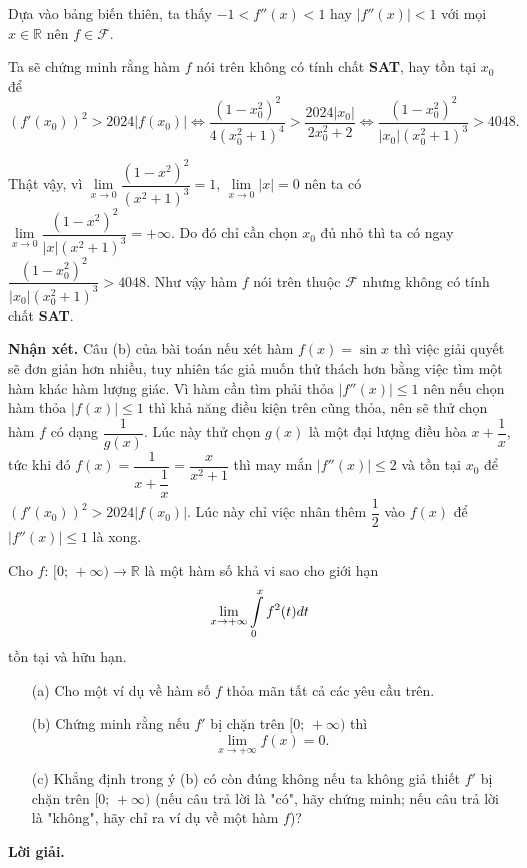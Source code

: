 \begin{enumerate}
{        Dựa vào bảng biến thiên, ta thấy $-1 < f''(x) < 1$ hay $|f''(x)| < 1$ với mọi $x \in \mathbb{R}$ nên $f\in \mathcal{F}$.

        Ta sẽ chứng minh rằng hàm $f$ nói trên không có tính chất \textbf{SAT}, hay tồn tại $x_0$ để $$\left(f'(x_0)\right)^2 > 2024|f(x_0)| \iff \dfrac{(1-x_0^2)^2}{4(x_0^2+1)^4} > \dfrac{2024|x_0|}{2x_0^2+2} \iff \dfrac{(1-x_0^2)^2}{|x_0|(x_0^2+1)^3}>4048.$$

        Thật vậy, vì $\lim\limits_{x \to 0} \dfrac{(1-x^2)^2}{(x^2+1)^3} = 1,\,\lim\limits_{x \to 0} |x| = 0$ nên ta có $\lim\limits_{x \to 0} \dfrac{(1-x^2)^2}{|x|(x^2+1)^3} = +\infty$. Do đó chỉ cần chọn $x_0$ đủ nhỏ thì ta có ngay $\dfrac{(1-x_0^2)^2}{|x_0|(x_0^2+1)^3}>4048$. Như vậy hàm $f$ nói trên thuộc $\mathcal{F}$ nhưng không có tính chất \textbf{SAT}.
    }
\end{enumerate}

\textbf{Nhận xét. }Câu (b) của bài toán nếu xét hàm $f(x) = \sin x$ thì việc giải quyết sẽ đơn giản hơn nhiều, tuy nhiên tác giả muốn thử thách hơn bằng việc tìm một hàm khác hàm lượng giác. Vì hàm cần tìm phải thỏa $|f''(x)| \leq 1$ nên nếu chọn hàm thỏa $|f(x)| \leq 1$ thì khả năng điều kiện trên cũng thỏa, nên sẽ thử chọn hàm $f$ có dạng $\dfrac{1}{g(x)}$. Lúc này thử chọn $g(x)$ là một đại lượng điều hòa $x + \dfrac{1}{x}$, tức khi đó $f(x) = \dfrac{1}{x + \dfrac{1}{x}} = \dfrac{x}{x^2 + 1}$ thì may mắn $|f''(x)| \leq 2$ và tồn tại $x_0$ để $\left(f'(x_0)\right)^2 > 2024|f(x_0)|$. Lúc này chỉ việc nhân thêm $\dfrac{1}{2}$ vào $f(x)$ để $|f''(x)| \leq 1$ là xong.

\begin{tcolorbox}[title=\textbf{Bài toán A.5.},breakable]
    Cho $f:\,[0;\,+\infty) \to \mathbb{R}$ là một hàm số khả vi sao cho giới hạn $$\lim\limits_{x \to +\infty} \int\displaylimits_{0}^{x}f^2(t)dt$$ tồn tại và hữu hạn.

    \begin{enumerate}
        \item[(a)] {Cho một ví dụ về hàm số $f$ thỏa mãn tất cả các yêu cầu trên.}
        \item[(b)] {Chứng minh rằng nếu $f'$ bị chặn trên $[0;\,+\infty)$ thì $$\lim\limits_{x \to +\infty}f(x) = 0.$$}  
        \item[(c)] {Khẳng định trong ý (b) có còn đúng không nếu ta không giả thiết $f'$ bị chặn trên $[0;\,+\infty)$ (nếu câu trả lời là "có", hãy chứng minh; nếu câu trả lời là "không", hãy chỉ ra ví dụ về một hàm $f$)?}
    \end{enumerate}
\end{tcolorbox}

\textbf{Lời giải. }